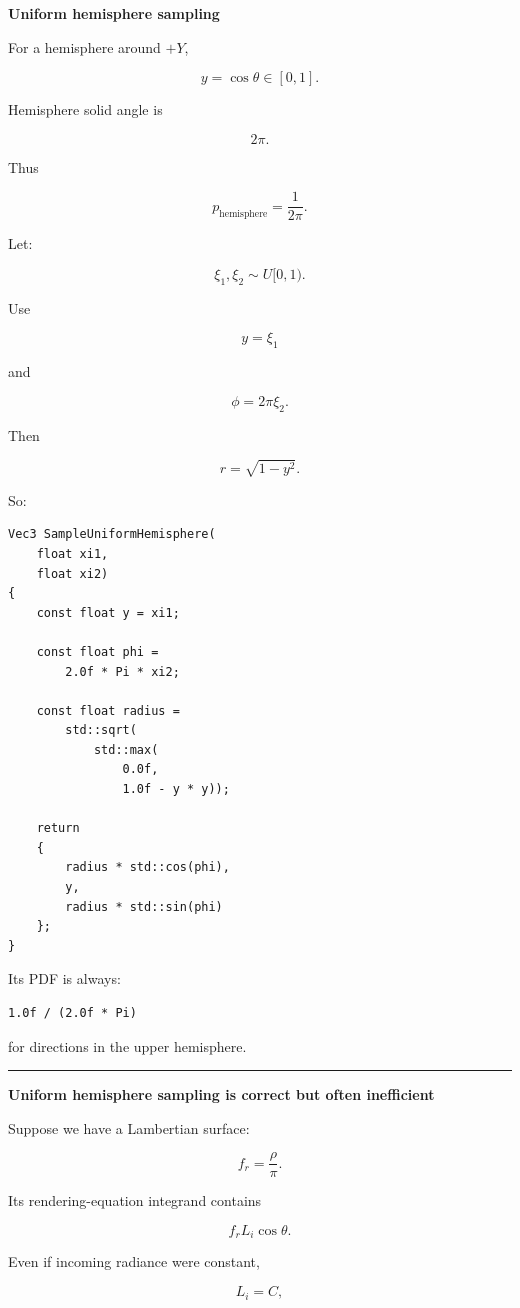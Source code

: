 \textbf{Uniform hemisphere sampling}

For a hemisphere around \(+Y\),

\[
y=\cos\theta\in[0,1].
\]

Hemisphere solid angle is

\[
2\pi.
\]

Thus

\[
\boxed{
p_{\text{hemisphere}}
=
\frac{1}{2\pi}.
}
\]

Let:

\[
\xi_1,\xi_2\sim U[0,1).
\]

Use

\[
\boxed{
y=\xi_1
}
\]

and

\[
\phi=2\pi\xi_2.
\]

Then

\[
r=\sqrt{1-y^2}.
\]

So:

\begin{verbatim}
Vec3 SampleUniformHemisphere(
    float xi1,
    float xi2)
{
    const float y = xi1;

    const float phi =
        2.0f * Pi * xi2;

    const float radius =
        std::sqrt(
            std::max(
                0.0f,
                1.0f - y * y));

    return
    {
        radius * std::cos(phi),
        y,
        radius * std::sin(phi)
    };
}
\end{verbatim}

Its PDF is always:

\begin{verbatim}
1.0f / (2.0f * Pi)
\end{verbatim}

for directions in the upper hemisphere.

\begin{center}\rule{0.5\linewidth}{0.5pt}\end{center}

\textbf{Uniform hemisphere sampling is correct but often inefficient}

Suppose we have a Lambertian surface:

\[
f_r=\frac{\rho}{\pi}.
\]

Its rendering-equation integrand contains

\[
f_rL_i\cos\theta.
\]

Even if incoming radiance were constant,

\[
L_i=C,
\]


